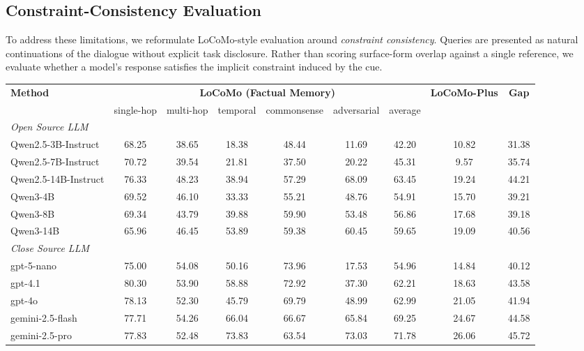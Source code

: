 \documentclass[11pt]{article}
\begin{document}
\subsection{Constraint-Consistency Evaluation}

To address these limitations, we reformulate LoCoMo-style evaluation
around \emph{constraint consistency}.
Queries are presented as natural continuations of the dialogue without
explicit task disclosure.
Rather than scoring surface-form overlap against a single reference,
we evaluate whether a model’s response satisfies the implicit constraint
induced by the cue.


\begin{table}[t]
\centering
\small
\setlength{\tabcolsep}{5pt}
\begin{tabular}{lcccccccc}
\toprule
\textbf{Method}
& \multicolumn{6}{c}{\textbf{LoCoMo (Factual Memory)}} 
& \textbf{LoCoMo-Plus}
& \textbf{Gap} \\
\cmidrule(lr){2-7}

& single-hop
& multi-hop
& temporal
& commonsense
& adversarial
& average
& 
& \\

\midrule
\multicolumn{9}{l}{\textit{Open Source LLM}} \\

\midrule
Qwen2.5-3B-Instruct   & 68.25 & 38.65 & 18.38 & 48.44 & 11.69 & 42.20 & 10.82 & 31.38 \\
Qwen2.5-7B-Instruct   & 70.72 & 39.54 & 21.81 & 37.50 & 20.22 & 45.31 & 9.57  & 35.74 \\
Qwen2.5-14B-Instruct  & 76.33 & 48.23 & 38.94 & 57.29 & 68.09 & 63.45 & 19.24 & 44.21 \\
Qwen3-4B              & 69.52 & 46.10 & 33.33 & 55.21 & 48.76 & 54.91 & 15.70 & 39.21 \\
Qwen3-8B              & 69.34 & 43.79 & 39.88 & 59.90 & 53.48 & 56.86 & 17.68 & 39.18 \\
Qwen3-14B             & 65.96 & 46.45 & 53.89 & 59.38 & 60.45 & 59.65 & 19.09 & 40.56 \\

\midrule
\multicolumn{9}{l}{\textit{Close Source LLM}} \\
\midrule
gpt-5-nano          & 75.00 & 54.08 & 50.16 & 73.96 & 17.53 & 54.96 & 14.84 & 40.12 \\
gpt-4.1             & 80.30 & 53.90 & 58.88 & 72.92 & 37.30 & 62.21 & 18.63 & 43.58 \\
gpt-4o              & 78.13 & 52.30 & 45.79 & 69.79 & 48.99 & 62.99 & 21.05 & 41.94 \\
gemini-2.5-flash    & 77.71 & 54.26 & 66.04 & 66.67 & 65.84 & 69.25 & 24.67 & 44.58 \\
gemini-2.5-pro      & 77.83 & 52.48 & 73.83 & 63.54 & 73.03 & 71.78 & 26.06 & 45.72 \\


\end{tabular}
\end{table}
\end{document}
